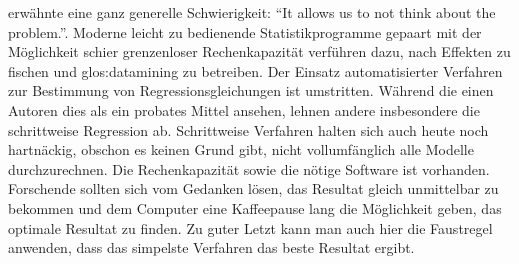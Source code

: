  erwähnte eine ganz generelle Schwierigkeit: ``It allows us to not think about the problem.''.
Moderne leicht zu bedienende Statistikprogramme gepaart mit der Möglichkeit schier grenzenloser Rechenkapazität verführen dazu, nach Effekten zu fischen und \gls{glos:datamining} zu betreiben.
Der Einsatz automatisierter Verfahren zur Bestimmung von Regressionsgleichungen ist umstritten. 
Während die einen Autoren dies als ein probates Mittel ansehen, lehnen andere insbesondere die schrittweise Regression ab. 
Schrittweise Verfahren halten sich auch heute noch hartnäckig, obschon es keinen Grund gibt, nicht vollumfänglich alle Modelle durchzurechnen. 
Die Rechenkapazität sowie die nötige Software ist vorhanden. 
Forschende sollten sich vom Gedanken lösen, das Resultat gleich unmittelbar zu bekommen und dem Computer eine Kaffeepause lang die Möglichkeit geben, das optimale Resultat zu finden.
Zu guter Letzt kann man auch hier die Faustregel anwenden, dass das simpelste Verfahren das beste Resultat ergibt.